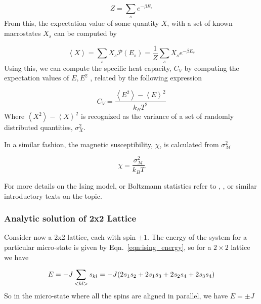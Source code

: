 \documentclass[10pt,showpacs,preprintnumbers,amsmath,amssymb,nofootinbib,aps,prl,twocolumn,groupedaddress,superscriptaddress,showkeys]{revtex4-1}
\begin{document}
      \begin{equation}
        Z = \sum_s e^{-\beta E_s}
      \end{equation}
      From this, the expectation value of some quantity $X$, with a set of known macrostates $X_s$ can be computed by

      \begin{equation}
        \left<X\right> = \sum_s X_s \mathcal P(E_s) = \frac{1}{Z} \sum_s X_s e^{-\beta E_s} 
      \end{equation}
      Using this, we can compute the specific heat capacity, $C_V$ by computing the expectation values of $E, E^2$ \cite{statmek_lecnotes}, related by the following expression

      \begin{equation}
        C_V = \frac{\left<E^2\right> - \left<E\right>^2}{k_B T^2}
      \end{equation}
      Where $\left<X^2\right> - \left<X\right>^2$ is recognized as the variance of a set of randomly distributed quantities, $\sigma_X^2$.

      In a similar fashion, the magnetic susceptibility, $\chi$, is calculated from $\sigma_\mathcal M ^2$ \cite{statmek_lecnotes}

      \begin{equation}
        \chi = \frac{\sigma^2_\mathcal M}{k_B T}
      \end{equation}

      For more details on the Ising model, or Boltzmann statistics refer to \textcite[Chapters~6, 8.2]{schroeder}, \textcite{statmek_lecnotes}, or similar introductory texts on the topic.

  \subsubsection{Analytic solution of 2x2 Lattice}
    Consider now a 2x2 lattice, each with spin $\pm 1$.
    The energy of the system for a particular micro-state is given by Eqn.~\ref{eqn:ising_energy}, so for a $2\times2$ lattice we have

    \begin{equation}
      E = -J\sum_{<kl>}s_{kl} = -J\qty( 2s_1s_2 + 2s_1s_3 + 2s_2s_4 + 2s_3s_4)
    \end{equation}
    So in the micro-state where all the spins are aligned in parallel, we have $E=\pm J$
\end{document}

